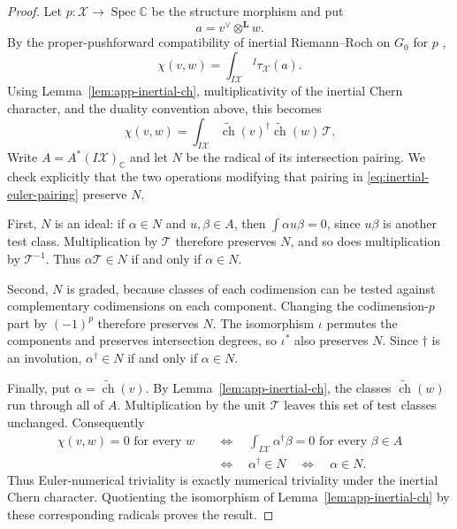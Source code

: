 \documentclass[11pt]{article}
\theoremstyle{plain}
\theoremstyle{definition}
\theoremstyle{remark}
\newcommand{\cX}{\mathcal X}
\newcommand{\C}{\mathbb C}
\newcommand{\1}{\mathbf 1}
\begin{document}
\begin{proof}
Let $p:\cX\to\operatorname{Spec}\C$ be the structure morphism and put
\[
a=v^\vee\otimes^{\mathbf L}w.
\]
By the proper-pushforward compatibility of inertial Riemann--Roch on $G_0$ for $p$ \cite[Theorem 5.1 and Corollary 5.3]{Edidin},
\[
\chi(v,w)=\int_{I\cX}{}^I\tau_{\cX}(a).
\]
Using Lemma~\ref{lem:app-inertial-ch}, multiplicativity of the inertial Chern character, and the duality convention above, this becomes
\begin{equation}\label{eq:inertial-euler-pairing}
\chi(v,w)=\int_{I\cX}
\widetilde{\operatorname{ch}}(v)^\dagger
\widetilde{\operatorname{ch}}(w)\,\mathcal T.
\end{equation}
Write $A=A^*(I\cX)_{\C}$ and let $N$ be the radical of its intersection pairing.  We check explicitly that the two operations modifying that pairing in \eqref{eq:inertial-euler-pairing} preserve $N$.

First, $N$ is an ideal: if $\alpha\in N$ and $u,\beta\in A$, then $\int\alpha u\beta=0$, since $u\beta$ is another test class.  Multiplication by $\mathcal T$ therefore preserves $N$, and so does multiplication by $\mathcal T^{-1}$.  Thus $\alpha\mathcal T\in N$ if and only if $\alpha\in N$.

Second, $N$ is graded, because classes of each codimension can be tested against complementary codimensions on each component.  Changing the codimension-$p$ part by $(-1)^p$ therefore preserves $N$.  The isomorphism $\iota$ permutes the components and preserves intersection degrees, so $\iota^*$ also preserves $N$.  Since $\dagger$ is an involution, $\alpha^\dagger\in N$ if and only if $\alpha\in N$.

Finally, put $\alpha=\widetilde{\operatorname{ch}}(v)$.  By Lemma~\ref{lem:app-inertial-ch}, the classes $\widetilde{\operatorname{ch}}(w)$ run through all of $A$.  Multiplication by the unit $\mathcal T$ leaves this set of test classes unchanged.  Consequently
\[
\begin{aligned}
\chi(v,w)=0\text{ for every }w
&\quad\Longleftrightarrow\quad
\int_{I\cX}\alpha^\dagger\beta=0\text{ for every }\beta\in A\\
&\quad\Longleftrightarrow\quad \alpha^\dagger\in N
\quad\Longleftrightarrow\quad \alpha\in N.
\end{aligned}
\]
Thus Euler-numerical triviality is exactly numerical triviality under the inertial Chern character.  Quotienting the isomorphism of Lemma~\ref{lem:app-inertial-ch} by these corresponding radicals proves the result.
\end{proof}
\end{document}

